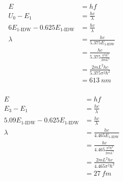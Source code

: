 \documentclass{article}
\begin{document}
\begin{align*}
  E                                       & = h f                                             \\
  U_0 - E_1                               & = \frac{h c}{\lambda}                             \\
  6 E_\text{1-IDW} - 0.625 E_\text{1-IDW} & = \frac{h c}{\lambda}                             \\
  \lambda                                 & = \frac{h c}{5.375 E_\text{1-IDW}}                \\
                                          & = \frac{h c}{5.375 \frac{\pi^2 \hbar^2}{2 m L^2}} \\
                                          & = \frac{2 m L^2 h c}{5.375 \pi^2 \hbar^2}         \\
                                          & = \qty{613}{nm}
\end{align*}

\setcounter{subsubsection}{24}
\subsubsection{}

\begin{align*}
  E                                          & = h f                                             \\
  E_3 - E_1                                  & = \frac{h c}{\lambda}                             \\
  5.09 E_\text{1-IDW} - 0.625 E_\text{1-IDW} & = \frac{h c}{\lambda}                             \\
  \lambda                                    & = \frac{h c}{4.465 E_\text{1-IDW}}                \\
                                             & = \frac{h c}{4.465 \frac{\pi^2 \hbar^2}{2 m L^2}} \\
                                             & = \frac{2 m L^2 h c}{4.465 \pi^2 \hbar^2}         \\
                                             & = \qty{27}{fm}
\end{align*}

\setcounter{subsubsection}{26}
\subsubsection{}
\end{document}
